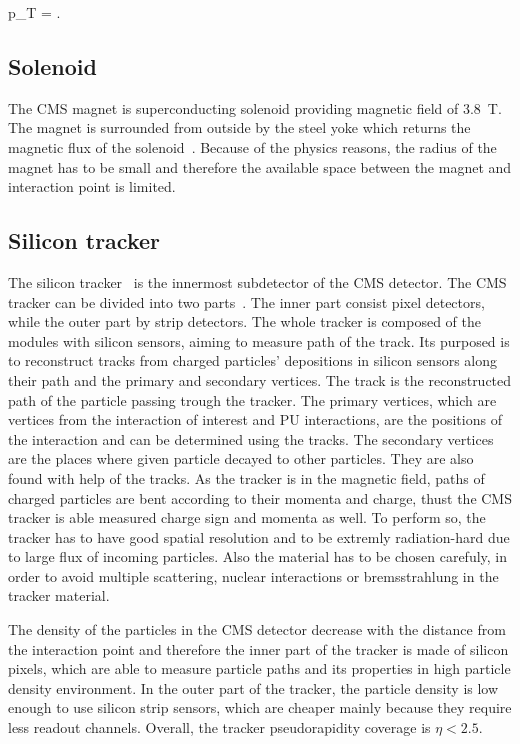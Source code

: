 {
    p_{T} =  .
}


\subsection{Solenoid}


The CMS magnet is superconducting solenoid providing magnetic field of 3.8~T. The magnet is surrounded from outside by the steel yoke which returns the magnetic flux of the solenoid~\cite{tdrMagnet}. Because of the physics reasons, the radius of the magnet has to be small and therefore the available space between the magnet and interaction point is limited.

\subsection{Silicon tracker}

The silicon tracker~\cite{CMS:1997tlf, CMS:2000eqx} is the innermost subdetector of the CMS detector. The CMS tracker can be divided into two parts~\cite{CMS:1997tlf}. The inner part consist pixel detectors, while the outer part by strip detectors. The whole tracker is composed of the modules with silicon sensors, aiming to measure path of the track. Its purposed is to reconstruct tracks from charged particles' depositions in silicon sensors along their path and the primary and secondary vertices. The track is the reconstructed path of the particle passing trough the tracker. The primary vertices, which are vertices from the interaction of interest and PU interactions, are the positions of the interaction and can be determined using the tracks. The secondary vertices are the places where given particle decayed to other particles. They are also found with help of the tracks. As the tracker is in the magnetic field, paths of charged particles are bent according to their momenta and charge, thust the CMS tracker is able measured charge sign and momenta as well. To perform so, the tracker has to have good spatial resolution and to be extremly radiation-hard due to large flux of incoming particles. Also the material has to be chosen carefuly, in order to avoid multiple scattering, nuclear interactions or bremsstrahlung in the tracker material.

The density of the particles in the CMS detector decrease with the distance from the interaction point and therefore the inner part of the tracker is made of silicon pixels, which are able to measure particle paths and its properties in high particle density environment. In the outer part of the tracker, the particle density is low enough to use silicon strip sensors, which are cheaper mainly because they require less readout channels. Overall, the tracker pseudorapidity coverage is  $\eta < 2.5$.

